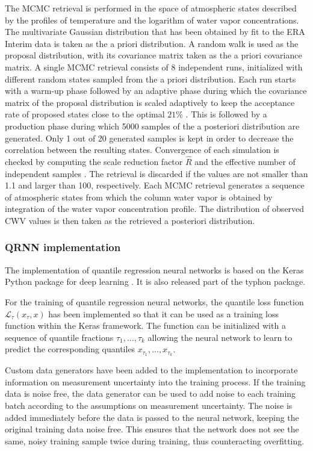 \documentclass[journal abbreviation, manuscript]{copernicus}
\begin{document}
  The MCMC retrieval is performed in the space of atmospheric states described
  by the profiles of temperature and the logarithm of water vapor
  concentrations. The multivariate Gaussian distribution that has been obtained
  by fit to the ERA Interim data is taken as the a priori distribution. A random
  walk is used as the proposal distribution, with its covariance matrix taken as
  the a priori covariance matrix. A single MCMC retrieval consists of 8
  independent runs, initialized with different random states sampled from the a
  priori distribution. Each run starts with a warm-up phase followed by an
  adaptive phase during which the covariance matrix of the proposal distribution
  is scaled adaptively to keep the acceptance rate of proposed states close to
  the optimal $21\%$ \citep{bda}. This is followed by a production phase during
  which 5000 samples of the a posteriori distribution are generated. Only 1 out
  of 20 generated samples is kept in order to decrease the correlation between
  the resulting states. Convergence of each simulation is checked by computing
  the scale reduction factor $\hat{R}$ and the effective number of independent
  samples \citep[Eq. (11.12), (11.13)]{bda}. The retrieval is discarded if the
  values are not smaller than 1.1 and larger than 100, respectively. Each MCMC
  retrieval generates a sequence of atmospheric states from which the column
  water vapor is obtained by integration of the water vapor concentration
  profile. The distribution of observed CWV values is then taken as the
  retrieved a posteriori distribution.

  
\subsubsection{QRNN implementation}
\label{sec:implementation_qrnn}

  The implementation of quantile regression neural networks is based on the
  Keras Python package for deep learning \citep{keras}. It is also released
  part of the typhon package.

  For the training of quantile regression neural networks, the quantile loss
  function $\mathcal{L}_\tau(x_\tau, x)$ has been implemented so that it can be
  used as a training loss function within the Keras framework. The function can
  be initialized with a sequence of quantile fractions $\tau_1, \ldots,
  \tau_k$ allowing the neural network to learn to predict the corresponding
  quantiles $x_{\tau_1}, \ldots, x_{\tau_k}$.

  Custom data generators have been added to the implementation  to incorporate
   information on measurement uncertainty into the training
  process. If the training data is noise free, the data generator can be used to
  add noise to each training batch according to the assumptions on measurement
  uncertainty. The noise is added immediately  before the data is passed to the
  neural network, keeping the original training data noise free. This ensures
  that the network does not see the same, noisy training sample twice during
  training, thus counteracting overfitting.
\end{document}
